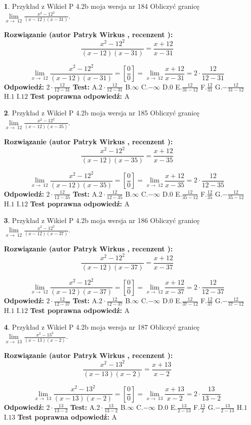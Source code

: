 \documentclass[12pt, a4paper]{article}
\theoremstyle{definition} %
\newtheorem{zad}{}
\newcommand{\zadStart}[1]{\begin{zad}#1\newline}
\newcommand{\zadStop}{\end{zad}}
\newcommand{\rozwStart}[2]{\noindent \textbf{Rozwiązanie (autor #1 , recenzent #2): }\newline}
\newcommand{\rozwStop}{\newline}
\newcommand{\odpStart}{\noindent \textbf{Odpowiedź:}\newline}
\newcommand{\odpStop}{\newline}
\newcommand{\testStart}{\noindent \textbf{Test:}\newline}
\newcommand{\testStop}{\newline}
\newcommand{\kluczStart}{\noindent \textbf{Test poprawna odpowiedź:}\newline}
\newcommand{\kluczStop}{\newline}
\begin{document}
\zadStart{Przykład z Wikieł P 4.2b moja wersja nr 184}
Obliczyć granicę $\lim\limits_{x\to\ 12}\frac{x^{2}-12^{2}}{(x-12)(x-31)}$.
\zadStop
\rozwStart{Patryk Wirkus}{}
$$\frac{x^{2}-12^{2}}{(x-12)(x-31)}=\frac{x+12}{x-31}$$

$$\lim\limits_{x\to\ 12}\frac{x^{2}-12^{2}}{(x-12)(x-31)}=[\frac{0}{0}]=\lim\limits_{x\to\ 12}\frac{x+12}{x-31}=2 \cdot \frac{12}{12-31}$$
\rozwStop
\odpStart
$2 \cdot \frac{12}{12-31}$
\odpStop
\testStart
A.$2 \cdot \frac{12}{12-31}$
B.$\infty$
C.$-\infty$
D.$0$
E.$\frac{12}{31-12}$
F.$\frac{12}{31}$
G.$-\frac{12}{31-12}$
H.$1$
I.$12$
\testStop
\kluczStart
A
\kluczStop



\zadStart{Przykład z Wikieł P 4.2b moja wersja nr 185}
Obliczyć granicę $\lim\limits_{x\to\ 12}\frac{x^{2}-12^{2}}{(x-12)(x-35)}$.
\zadStop
\rozwStart{Patryk Wirkus}{}
$$\frac{x^{2}-12^{2}}{(x-12)(x-35)}=\frac{x+12}{x-35}$$

$$\lim\limits_{x\to\ 12}\frac{x^{2}-12^{2}}{(x-12)(x-35)}=[\frac{0}{0}]=\lim\limits_{x\to\ 12}\frac{x+12}{x-35}=2 \cdot \frac{12}{12-35}$$
\rozwStop
\odpStart
$2 \cdot \frac{12}{12-35}$
\odpStop
\testStart
A.$2 \cdot \frac{12}{12-35}$
B.$\infty$
C.$-\infty$
D.$0$
E.$\frac{12}{35-12}$
F.$\frac{12}{35}$
G.$-\frac{12}{35-12}$
H.$1$
I.$12$
\testStop
\kluczStart
A
\kluczStop



\zadStart{Przykład z Wikieł P 4.2b moja wersja nr 186}
Obliczyć granicę $\lim\limits_{x\to\ 12}\frac{x^{2}-12^{2}}{(x-12)(x-37)}$.
\zadStop
\rozwStart{Patryk Wirkus}{}
$$\frac{x^{2}-12^{2}}{(x-12)(x-37)}=\frac{x+12}{x-37}$$

$$\lim\limits_{x\to\ 12}\frac{x^{2}-12^{2}}{(x-12)(x-37)}=[\frac{0}{0}]=\lim\limits_{x\to\ 12}\frac{x+12}{x-37}=2 \cdot \frac{12}{12-37}$$
\rozwStop
\odpStart
$2 \cdot \frac{12}{12-37}$
\odpStop
\testStart
A.$2 \cdot \frac{12}{12-37}$
B.$\infty$
C.$-\infty$
D.$0$
E.$\frac{12}{37-12}$
F.$\frac{12}{37}$
G.$-\frac{12}{37-12}$
H.$1$
I.$12$
\testStop
\kluczStart
A
\kluczStop



\zadStart{Przykład z Wikieł P 4.2b moja wersja nr 187}
Obliczyć granicę $\lim\limits_{x\to\ 13}\frac{x^{2}-13^{2}}{(x-13)(x-2)}$.
\zadStop
\rozwStart{Patryk Wirkus}{}
$$\frac{x^{2}-13^{2}}{(x-13)(x-2)}=\frac{x+13}{x-2}$$

$$\lim\limits_{x\to\ 13}\frac{x^{2}-13^{2}}{(x-13)(x-2)}=[\frac{0}{0}]=\lim\limits_{x\to\ 13}\frac{x+13}{x-2}=2 \cdot \frac{13}{13-2}$$
\rozwStop
\odpStart
$2 \cdot \frac{13}{13-2}$
\odpStop
\testStart
A.$2 \cdot \frac{13}{13-2}$
B.$\infty$
C.$-\infty$
D.$0$
E.$\frac{13}{2-13}$
F.$\frac{13}{2}$
G.$-\frac{13}{2-13}$
H.$1$
I.$13$
\testStop
\kluczStart
A
\kluczStop
\end{document}
